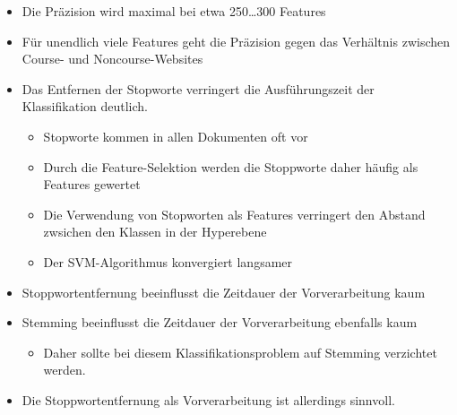 \begin{frame}[c]
\begin{itemize}
  \item{Die Präzision wird maximal bei etwa 250\ldots300 Features}
  \item{Für unendlich viele Features geht die Präzision gegen das Verhältnis
  zwischen Course- und Noncourse-Websites}
  \begin{itemize}
  \end{itemize}
  \item Das Entfernen der Stopworte verringert die Ausführungszeit der
  Klassifikation deutlich.
  \begin{itemize}
  \item Stopworte kommen in allen Dokumenten oft vor
  \item Durch die Feature-Selektion werden die Stoppworte daher häufig als
  Features gewertet
  \item Die Verwendung von Stopworten als Features verringert den Abstand
  zwsichen den Klassen in der Hyperebene 
  \item Der SVM-Algorithmus konvergiert langsamer
\end{itemize}
\end{itemize}
\end{frame}

\begin{frame}[c]
\begin{itemize}
  \item Stoppwortentfernung beeinflusst die Zeitdauer der Vorverarbeitung kaum
  \item Stemming beeinflusst die Zeitdauer der Vorverarbeitung ebenfalls kaum
  \begin{itemize}
  \item Daher sollte bei diesem Klassifikationsproblem auf Stemming verzichtet
  werden.
\end{itemize}
  \item Die Stoppwortentfernung als Vorverarbeitung ist allerdings sinnvoll.
\end{itemize}
\end{frame}

